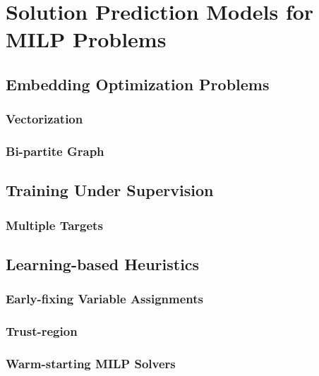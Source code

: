 

\chapter{Solution Prediction Models for MILP Problems}\label{chap:solution-prediction}

\section{Embedding Optimization Problems}

\subsection{Vectorization}

\subsection{Bi-partite Graph}

\section{Training Under Supervision}

\subsection{Multiple Targets}

\section{Learning-based Heuristics}\label{sec:learning-based-heuristics}

\subsection{Early-fixing Variable Assignments}

\subsection{Trust-region}

\subsection{Warm-starting MILP Solvers}

